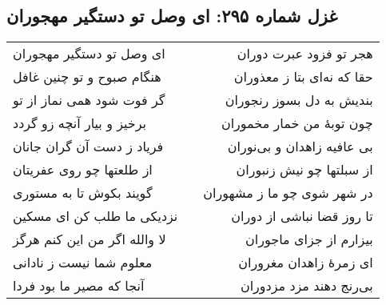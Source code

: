 \begin{center}
\section*{غزل شماره ۲۹۵: ای وصل تو دستگیر مهجوران}
\label{sec:295}
\begin{longtable}{l p{0.5cm} r}
ای وصل تو دستگیر مهجوران
&&
هجر تو فزود عبرت دوران
\\
هنگام صبوح و تو چنین غافل
&&
حقا که نه‌ای بتا ز معذوران
\\
گر فوت شود همی نماز از تو
&&
بندیش به دل بسوز رنجوران
\\
برخیز و بیار آنچه زو گردد
&&
چون توبهٔ من خمار مخموران
\\
فریاد ز دست آن گران جانان
&&
بی عافیه زاهدان و بی‌نوران
\\
از طلعتها چو روی عفریتان
&&
از سبلتها چو نیش زنبوران
\\
گویند بکوش تا به مستوری
&&
در شهر شوی چو ما ز مشهوران
\\
نزدیکی ما طلب کن ای مسکین
&&
تا روز قضا نباشی از دوران
\\
لا والله اگر من این کنم هرگز
&&
بیزارم از جزای ماجوران
\\
معلوم شما نیست ز نادانی
&&
ای زمرهٔ زاهدان مغروران
\\
آنجا که مصیر ما بود فردا
&&
بی‌رنج دهند مزد مزدوران
\\
\end{longtable}
\end{center}
